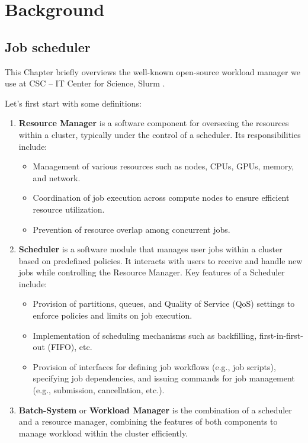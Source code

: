 \chapter{Background}
\label{chap:background}
\section{Job scheduler}
\label{Sec:jobScheduler}
This Chapter briefly overviews the well-known open-source workload manager we use at CSC -- IT Center for Science, Slurm \cite{10.1007/10968987_3}.

Let's first start with some definitions:

\begin{enumerate}
    \item \textbf{Resource Manager} is a software component for overseeing the resources within a cluster, typically under the control of a scheduler. Its responsibilities include:

    \begin{itemize}
        \item Management of various resources such as nodes, CPUs, GPUs, memory, and network.
        \item Coordination of job execution across compute nodes to ensure efficient resource utilization.
        \item Prevention of resource overlap among concurrent jobs.
    \end{itemize}
    \item \textbf{Scheduler} is a software module that manages user jobs within a cluster based on predefined policies. It interacts with users to receive and handle new jobs while controlling the Resource Manager. Key features of a Scheduler include:

    \begin{itemize}
        \item Provision of partitions, queues, and Quality of Service (QoS) settings to enforce policies and limits on job execution.
        \item Implementation of scheduling mechanisms such as backfilling, first-in-first-out (FIFO), etc.
        \item Provision of interfaces for defining job workflows (e.g., job scripts), specifying job dependencies, and issuing commands for job management (e.g., submission, cancellation, etc.).
    \end{itemize}

    \item \textbf{Batch-System} or \textbf{Workload Manager} is the combination of a scheduler and a resource manager, combining the features of both components to manage workload within the cluster efficiently.
\end{enumerate}


